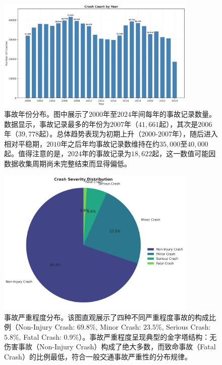 \documentclass[12pt,a4paper]{article}
\begin{document}
\begin{figure}[!htb]
  \centering
  \includegraphics[width=0.85\textwidth]{crash_year_distribution.png}
  \caption{事故年份分布。图中展示了$2000$年至$2024$年间每年的事故记录数量。数据显示，事故记录最多的年份为$2007$年（$41,661$起），其次是$2006$年（$39,778$起）。总体趋势表现为初期上升（$2000$-$2007$年），随后进入相对平稳期，$2010$年之后年均事故记录数维持在约$35,000$至$40,000$起。值得注意的是，$2024$年的事故记录为$18,622$起，这一数值可能因数据收集周期尚未完整结束而显得偏低。}
  \label{fig:crash_year_distribution}
\end{figure}

\FloatBarrier  %

\begin{figure}[!htb]
  \centering
  \includegraphics[width=0.85\textwidth]{crash_severity_distribution.png}
  \caption{事故严重程度分布。该图直观展示了四种不同严重程度事故的构成比例（Non-Injury Crash: $69.8\%$, Minor Crash: $23.5\%$, Serious Crash: $5.8\%$, Fatal Crash: $0.9\%$）。事故严重程度呈现典型的金字塔结构：无伤害事故（Non-Injury Crash）构成了绝大多数，而致命事故（Fatal Crash）的比例最低，符合一般交通事故严重性的分布规律。}
  \label{fig:crash_severity_distribution}
\end{figure}
\end{document}
